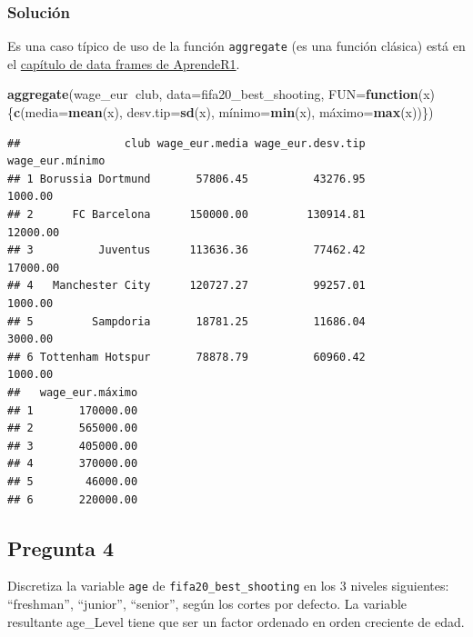 \documentclass[]{article}
\newenvironment{Shaded}{\begin{snugshade}}{\end{snugshade}}
\newcommand{\ControlFlowTok}[1]{\textcolor[rgb]{0.13,0.29,0.53}{\textbf{#1}}}
\newcommand{\DataTypeTok}[1]{\textcolor[rgb]{0.13,0.29,0.53}{#1}}
\newcommand{\KeywordTok}[1]{\textcolor[rgb]{0.13,0.29,0.53}{\textbf{#1}}}
\newcommand{\NormalTok}[1]{#1}
\newcommand{\OperatorTok}[1]{\textcolor[rgb]{0.81,0.36,0.00}{\textbf{#1}}}
\begin{document}
\hypertarget{soluciuxf3n-2}{%
\subsubsection{Solución}\label{soluciuxf3n-2}}

Es una caso típico de uso de la función \texttt{aggregate} (es una
función clásica) está en el
\href{https://aprender-uib.github.io/AprendeR1/chap-df.html}{capítulo de
data frames de AprendeR1}.

\begin{Shaded}
\begin{Highlighting}[]
\KeywordTok{aggregate}\NormalTok{(wage_eur}\OperatorTok{~}\NormalTok{club, }\DataTypeTok{data=}\NormalTok{fifa20_best_shooting,}
          \DataTypeTok{FUN=}\ControlFlowTok{function}\NormalTok{(x)\{}\KeywordTok{c}\NormalTok{(}\DataTypeTok{media=}\KeywordTok{mean}\NormalTok{(x),}
                            \DataTypeTok{desv.tip=}\KeywordTok{sd}\NormalTok{(x),}
\NormalTok{                            mí}\DataTypeTok{nimo=}\KeywordTok{min}\NormalTok{(x),}
\NormalTok{                            má}\DataTypeTok{ximo=}\KeywordTok{max}\NormalTok{(x))\})}
\end{Highlighting}
\end{Shaded}

\begin{verbatim}
##                club wage_eur.media wage_eur.desv.tip wage_eur.mínimo
## 1 Borussia Dortmund       57806.45          43276.95         1000.00
## 2      FC Barcelona      150000.00         130914.81        12000.00
## 3          Juventus      113636.36          77462.42        17000.00
## 4   Manchester City      120727.27          99257.01         1000.00
## 5         Sampdoria       18781.25          11686.04         3000.00
## 6 Tottenham Hotspur       78878.79          60960.42         1000.00
##   wage_eur.máximo
## 1       170000.00
## 2       565000.00
## 3       405000.00
## 4       370000.00
## 5        46000.00
## 6       220000.00
\end{verbatim}

\hypertarget{pregunta-4}{%
\subsection{Pregunta 4}\label{pregunta-4}}

Discretiza la variable \texttt{age} de \texttt{fifa20\_best\_shooting}
en los 3 niveles siguientes: ``freshman'', ``junior'', ``senior'', según
los cortes por defecto. La variable resultante age\_Level tiene que ser
un factor ordenado en orden creciente de edad.
\end{document}
